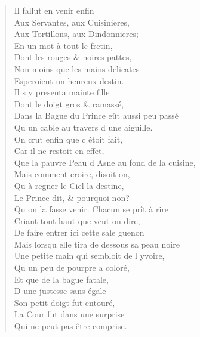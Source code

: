 \begin{verse}
\vin Il fallut en venir enfin \\
\vin Aux Servantes, aux Cuisinieres, \\
\vin Aux Tortillons, aux Dindonnieres; \\
\vin En un mot à tout le fretin, \\
\vin Dont les rouges \& noires pattes, \\
\vin Non moins que les mains delicates \\
\vin Esperoient un heureux destin. \\
\vin Il s\textquotesingle{} y presenta mainte fille \\
\vin Dont le doigt gros \& ramassé, \\
Dans la Bague du Prince eût aussi peu passé \\
\vin Qu\textquotesingle{} un cable au travers d\textquotesingle{} une aiguille. \\
\vin On crut enfin que c\textquotesingle{} étoit fait, \\
\vin Car il ne restoit en effet, \\
Que la pauvre Peau d\textquotesingle{} Asne au fond de la cuisine, \\
\vin Mais comment croire, disoit-on, \\
\vin Qu\textquotesingle{} à regner le Ciel la destine, \\
\vin Le Prince dit, \& pourquoi non? \\
Qu\textquotesingle{} on la fasse venir. Chacun se prît à rire \\
Criant tout haut que veut-on dire, \\
De faire entrer ici cette sale guenon \\
Mais lorsqu\textquotesingle{} elle tira de dessous sa peau noire \\
Une petite main qui sembloit de l\textquotesingle{} yvoire, \\
\vin Qu\textquotesingle{} un peu de pourpre a coloré, \\
\vin Et que de la bague fatale, \\
\vin D\textquotesingle{} une justesse sans égale \\
\vin Son petit doigt fut entouré, \\
\vin La Cour fut dans une surprise \\
\vin Qui ne peut pas être comprise.


\end{verse}
